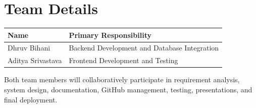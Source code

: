 \documentclass[12pt,a4paper]{article}
\begin{document}

\section{Team Details}

\begin{center}

\renewcommand{\arraystretch}{1.5}

\begin{tabular}{|p{4cm}|p{6cm}|}
\hline
\textbf{Name} & \textbf{Primary Responsibility} \\
\hline
Dhruv Bihani & Backend Development and Database Integration \\
\hline
Aditya Srivastava & Frontend Development and Testing \\
\hline
\end{tabular}

\end{center}

Both team members will collaboratively participate in requirement analysis, system design, documentation, GitHub management, testing, presentations, and final deployment.


\end{document}
